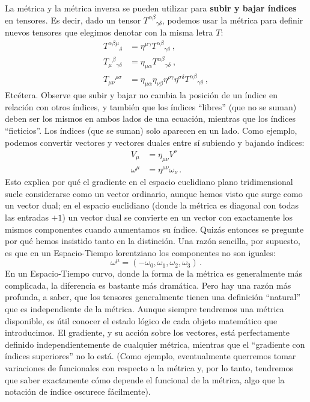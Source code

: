 \documentclass[11pt,b5paper,openany,twoside]{book}
\newcommand{\mn}{{\mu\nu}}
\begin{document}
La métrica y la métrica inversa se pueden utilizar para {\bf subir y bajar índices} en tensores.
Es decir, dado un tensor $T^{\alpha\beta}{}_{\gamma\delta}$, podemos usar la métrica para definir nuevos tensores que elegimos denotar con la misma letra $T$:
\begin{align}
T^{\alpha\beta\mu}{}_\delta &= \eta^{\mu\gamma}
T^{\alpha\beta}{}_{\gamma\delta}\ , \nonumber \\
T_\mu{}^\beta{}_{\gamma\delta} &= \eta_{\mu\alpha}
T^{\alpha\beta}{}_{\gamma\delta}\ , \nonumber \\
T_{\mu\nu}{}^{\rho\sigma} &= \eta_{\mu\alpha}\eta_{\nu\beta}
\eta^{\rho\gamma}\eta^{\sigma\delta}
T^{\alpha\beta}{}_{\gamma\delta}\ , \label{1.61}
\end{align}
Etcétera.
Observe que subir y bajar no cambia la posición de un índice en relación con otros índices, y también que los índices ``libres'' (que no se suman) deben ser los mismos en ambos lados de una ecuación, mientras que los índices ``ficticios''. Los índices (que se suman) solo aparecen en un lado.
Como ejemplo, podemos convertir vectores y vectores duales entre sí subiendo y bajando índices:
\begin{align}
V_\mu &= \eta_\mn V^\nu\nonumber \\
\omega^\mu &= \eta^\mn \omega_\nu\,. \label{1.62}
\end{align}
Esto explica por qué el gradiente en el espacio euclidiano plano tridimensional suele considerarse como un vector ordinario, aunque hemos visto que surge como un vector dual; en el espacio euclidiano (donde la métrica es diagonal con todas las entradas $+1$) un vector dual se convierte en un vector con exactamente los mismos componentes cuando aumentamos su índice.
Quizás entonces se pregunte por qué hemos insistido tanto en la distinción.
Una razón sencilla, por supuesto, es que en un Espacio-Tiempo lorentziano los componentes no son iguales:
\begin{equation}
\omega^\mu = (-\omega_0, \omega_1, \omega_2, \omega_3)\,.\label{1.63}
\end{equation}
En un Espacio-Tiempo curvo, donde la forma de la métrica es generalmente más complicada, la diferencia es bastante más dramática.
Pero hay una razón más profunda, a saber, que los tensores generalmente tienen una definición ``natural'' que es independiente de la métrica.
Aunque siempre tendremos una métrica disponible, es útil conocer el estado lógico de cada objeto matemático que introducimos.
El gradiente, y su acción sobre los vectores, está perfectamente definido independientemente de cualquier métrica, mientras que el ``gradiente con índices superiores'' no lo está.
(Como ejemplo, eventualmente querremos tomar variaciones de funcionales con respecto a la métrica y, por lo tanto, tendremos que saber exactamente cómo depende el funcional de la métrica, algo que la notación de índice oscurece fácilmente).
\end{document}

